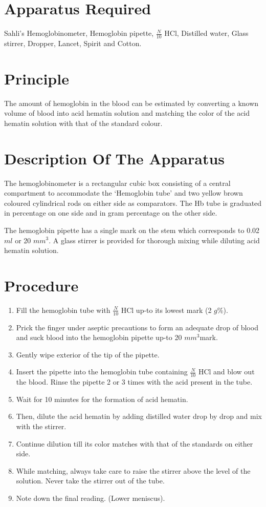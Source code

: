 \documentclass[a4paper,12pt,openany,oneside]{book}
\begin{document}
								\section*{Apparatus Required}
								Sahli’s Hemoglobinometer, Hemoglobin pipette, $\frac{N}{10}$ HCl, Distilled water, Glass stirrer, Dropper, Lancet, Spirit and Cotton.
								\section*{Principle}
								The amount of hemoglobin in the blood can be estimated by converting a known volume of blood into acid hematin solution and matching the color of the acid hematin solution with that of the standard colour.
								\section*{Description Of The Apparatus}
								The hemoglobinometer is a rectangular cubic box consisting of a central compartment to accommodate the ‘Hemoglobin tube’ and two yellow brown coloured cylindrical rods on either side as comparators. The Hb tube is graduated in percentage on one side and in gram percentage on the other side.

								The hemoglobin pipette has a single mark on the stem which corresponds to 0.02 $ml$ or 20 $mm^{3}$. A glass stirrer is provided for thorough mixing while diluting acid hematin solution.
								\section*{Procedure}
								\begin{enumerate}
									\item{Fill the hemoglobin tube with $\frac{N}{10}$ HCl up-to its lowest mark (2 $g$\%).}
									\item{Prick the finger under aseptic precautions to form an adequate drop of blood and suck blood into the hemoglobin pipette up-to 20 $mm^{3}$mark.}
									\item{Gently wipe exterior of the tip of the pipette.}
									\item{Insert the pipette into the hemoglobin tube containing $\frac{N}{10}$ HCl and blow out the blood. Rinse the pipette 2 or 3 times with the acid present in the tube.}
									\item{Wait for 10 minutes for the formation of acid hematin.}
									\item{Then, dilute the acid hematin by adding distilled water drop by drop and mix with the stirrer.}
									\item{Continue dilution till its color matches with that of the standards on either side.}
									\item{While matching, always take care to raise the stirrer above the level of the solution. Never take the stirrer out of the tube.}
									\item{Note down the final reading. (Lower meniscus).}
								\end{enumerate}
\end{document}
